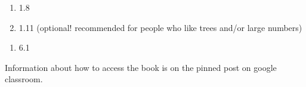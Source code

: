 \documentclass[12pt]{article}
\begin{document}
\begin{enumerate}
\setlength{\itemsep}{-1mm}
\item 1.8
\item 1.11 (optional! recommended for people who like trees and/or
  large numbers)\\
\end{enumerate}

\begin{enumerate}
\setlength{\itemsep}{-1mm}
\item 6.1\\
\end{enumerate}

\noindent Information about how to access the book is on the
pinned post on google classroom. 
\end{document}
